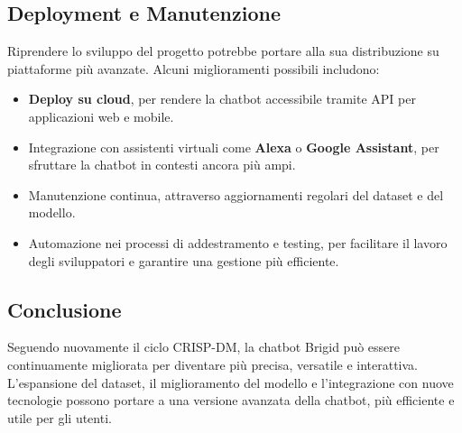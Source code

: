 \documentclass[12pt, letterpaper]{article}
\begin{document}
\subsection{Deployment e Manutenzione}
Riprendere lo sviluppo del progetto potrebbe portare alla sua distribuzione su piattaforme più avanzate. Alcuni miglioramenti possibili includono:
\begin{itemize}
	\item \textbf{Deploy su cloud}, per rendere la chatbot accessibile tramite API per applicazioni web e mobile.
	\item Integrazione con assistenti virtuali come \textbf{Alexa} o \textbf{Google Assistant}, per sfruttare la chatbot in contesti ancora più ampi.
	\item Manutenzione continua, attraverso aggiornamenti regolari del dataset e del modello.
	\item Automazione nei processi di addestramento e testing, per facilitare il lavoro degli sviluppatori e garantire una gestione più efficiente.
\end{itemize}

\subsection{Conclusione}
Seguendo nuovamente il ciclo CRISP-DM, la chatbot Brigid può essere continuamente migliorata per diventare più precisa, versatile e interattiva. L’espansione del dataset, il miglioramento del modello e l’integrazione con nuove tecnologie possono portare a una versione avanzata della chatbot, più efficiente e utile per gli utenti.

\newpage
\end{document}

